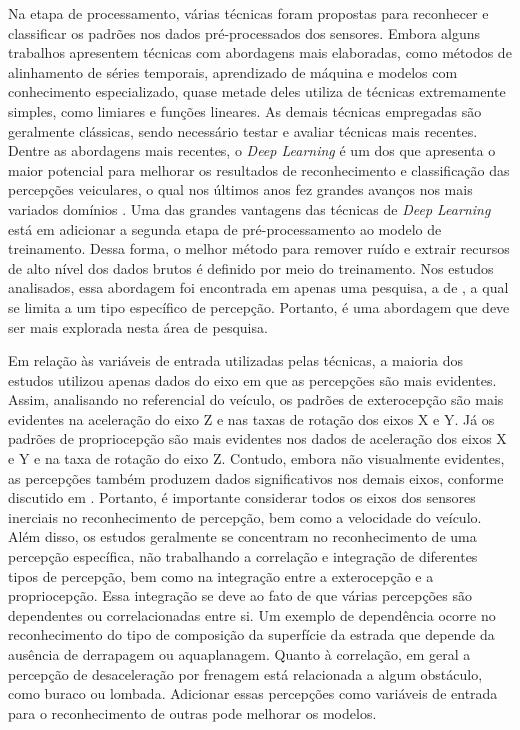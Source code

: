 Na etapa de processamento, várias técnicas foram propostas para reconhecer e classificar os padrões nos dados pré-processados dos sensores. Embora alguns trabalhos apresentem técnicas com abordagens mais elaboradas, como métodos de alinhamento de séries temporais, aprendizado de máquina e modelos com conhecimento especializado, quase metade deles utiliza de técnicas extremamente simples, como limiares e funções lineares. As demais técnicas empregadas são geralmente clássicas, sendo necessário testar e avaliar técnicas mais recentes. Dentre as abordagens mais recentes, o \textit{Deep Learning} é um dos que apresenta o maior potencial para melhorar os resultados de reconhecimento e classificação das percepções veiculares, o qual nos últimos anos fez grandes avanços nos mais variados domínios \cite{LeCun2015}. Uma das grandes vantagens das técnicas de \textit{Deep Learning} está em adicionar a segunda etapa de pré-processamento ao modelo de treinamento. Dessa forma, o melhor método para remover ruído e extrair recursos de alto nível dos dados brutos é definido por meio do treinamento. Nos estudos analisados, essa abordagem foi encontrada em apenas uma pesquisa, a de , a qual se limita a um tipo específico de percepção. Portanto, é uma abordagem que deve ser mais explorada nesta área de pesquisa.

Em relação às variáveis de entrada utilizadas pelas técnicas, a maioria dos estudos utilizou apenas dados do eixo em que as percepções são mais evidentes. Assim, analisando no referencial do veículo, os padrões de exterocepção são mais evidentes na aceleração do eixo Z e nas taxas de rotação dos eixos X e Y. Já os padrões de propriocepção são mais evidentes nos dados de aceleração dos eixos X e Y e na taxa de rotação do eixo Z. Contudo, embora não visualmente evidentes, as percepções também produzem dados significativos nos demais eixos, conforme discutido em . Portanto, é importante considerar todos os eixos dos sensores inerciais no reconhecimento de percepção, bem como a velocidade do veículo. Além disso, os estudos geralmente se concentram no reconhecimento de uma percepção específica, não trabalhando a correlação e integração de diferentes tipos de percepção, bem como na integração entre a exterocepção e a propriocepção. Essa integração se deve ao fato de que várias percepções são dependentes ou correlacionadas entre si. Um exemplo de dependência ocorre no reconhecimento do tipo de composição da superfície da estrada que depende da ausência de derrapagem ou aquaplanagem. Quanto à correlação, em geral a percepção de desaceleração por frenagem está relacionada a algum obstáculo, como buraco ou lombada. Adicionar essas percepções como variáveis de entrada para o reconhecimento de outras pode melhorar os modelos. 

